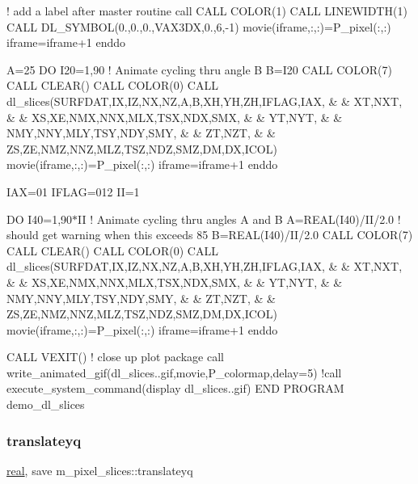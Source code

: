 ! add a label after master routine call C\+A\+LL C\+O\+L\+O\+R(1) C\+A\+LL L\+I\+N\+E\+W\+I\+D\+T\+H(1) C\+A\+LL D\+L\+\_\+\+S\+Y\+M\+B\+OL(0.,0.,0.,\textquotesingle{}V\+A\+X3\+DX\textquotesingle{},0.,6,-\/1) movie(iframe,\+:,\+:)=P\+\_\+pixel(\+:,\+:) iframe=iframe+1 enddo

A=25 DO I20=1,90 ! Animate cycling thru angle B B=I20 C\+A\+LL C\+O\+L\+O\+R(7) C\+A\+LL C\+L\+E\+A\+R() C\+A\+LL C\+O\+L\+O\+R(0) C\+A\+LL dl\+\_\+slices(S\+U\+R\+F\+D\+AT,IX,IZ,NX,NZ,A,B,XH,YH,ZH,I\+F\+L\+AG,I\+AX, \& \& XT,N\+XT, \& \& XS,XE,N\+MX,N\+NX,M\+LX,T\+SX,N\+DX,S\+MX, \& \& YT,N\+YT, \& \& N\+MY,N\+NY,M\+LY,T\+SY,N\+DY,S\+MY, \& \& ZT,N\+ZT, \& \& ZS,ZE,N\+MZ,N\+NZ,M\+LZ,T\+SZ,N\+DZ,S\+MZ,DM,DX,I\+C\+OL) movie(iframe,\+:,\+:)=P\+\_\+pixel(\+:,\+:) iframe=iframe+1 enddo

I\+AX=01 I\+F\+L\+AG=012 II=1

DO I40=1,90$\ast$\+II ! Animate cycling thru angles A and B A=R\+E\+A\+L(\+I40)/\+I\+I/2.0 ! should get warning when this exceeds 85 B=R\+E\+A\+L(\+I40)/\+I\+I/2.0 C\+A\+LL C\+O\+L\+O\+R(7) C\+A\+LL C\+L\+E\+A\+R() C\+A\+LL C\+O\+L\+O\+R(0) C\+A\+LL dl\+\_\+slices(S\+U\+R\+F\+D\+AT,IX,IZ,NX,NZ,A,B,XH,YH,ZH,I\+F\+L\+AG,I\+AX, \& \& XT,N\+XT, \& \& XS,XE,N\+MX,N\+NX,M\+LX,T\+SX,N\+DX,S\+MX, \& \& YT,N\+YT, \& \& N\+MY,N\+NY,M\+LY,T\+SY,N\+DY,S\+MY, \& \& ZT,N\+ZT, \& \& ZS,ZE,N\+MZ,N\+NZ,M\+LZ,T\+SZ,N\+DZ,S\+MZ,DM,DX,I\+C\+OL) movie(iframe,\+:,\+:)=P\+\_\+pixel(\+:,\+:) iframe=iframe+1 enddo

C\+A\+LL V\+E\+X\+I\+T() ! close up plot package call write\+\_\+animated\+\_\+gif(\textquotesingle{}dl\+\_\+slices..\+gif\textquotesingle{},movie,P\+\_\+colormap,delay=5) !call execute\+\_\+system\+\_\+command(\textquotesingle{}display dl\+\_\+slices..\+gif\textquotesingle{}) E\+ND P\+R\+O\+G\+R\+AM demo\+\_\+dl\+\_\+slices \mbox{\label{namespacem__pixel__slices_ac0ed11bf15d4d4bf8a97194d64035b02}} 
\subsubsection{\texorpdfstring{translateyq}{translateyq}}
{\footnotesize\ttfamily \hyperlink{read__watch_83_8txt_abdb62bde002f38ef75f810d3a905a823}{real}, save m\+\_\+pixel\+\_\+slices\+::translateyq\hspace{0.3cm}{\ttfamily [private]}}

